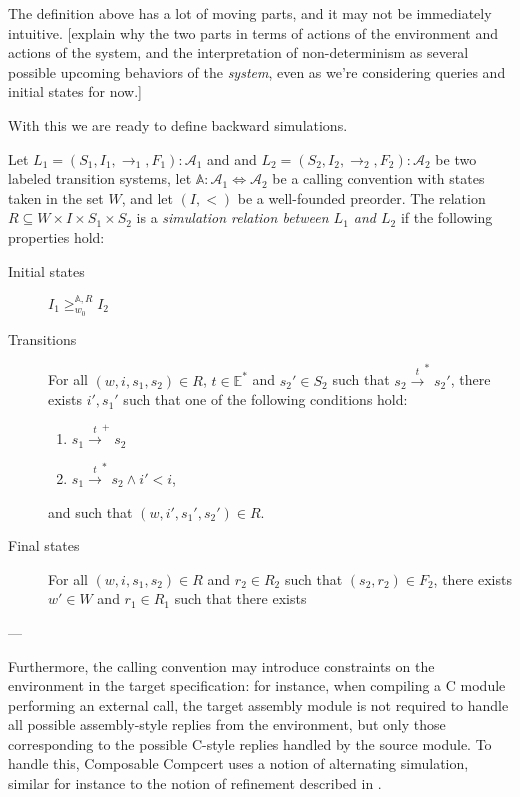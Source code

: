 The definition above has a lot of moving parts, and
it may not be immediately intuitive.
[explain why the two parts in terms of
actions of the environment and actions of the system,
and the interpretation of non-determinism as
several possible upcoming behaviors of the \emph{system},
even as we're considering queries and initial states for now.]

With this we are ready to define backward simulations.

\begin{definition}
Let $L_1 = (S_1, I_1, \rightarrow_1, F_1) : \mathcal{A}_1$ and
and $L_2 = (S_2, I_2, \rightarrow_2, F_2) : \mathcal{A}_2$
be two labeled transition systems,
let $\mathbb{A} : \mathcal{A}_1 \Leftrightarrow \mathcal{A}_2$
be a calling convention with states taken in the set $W$, and
let $(I, <)$ be a well-founded preorder.
The relation $R \subseteq W \times I \times S_1 \times S_2$
is a \emph{simulation relation between $L_1$ and $L_2$}
if the following properties hold:
\begin{description}
\item[Initial states]
  $I_1 \ge^{\mathbb{A},R}_{w_0} I_2$
\item[Transitions]
  For all $(w, i, s_1, s_2) \in R$, $t \in \mathbb{E}^*$ and $s_2' \in S_2$
  such that $s_2 \xrightarrow{t}^* s_2'$,
  there exists $i', s_1'$ such that one of the following conditions hold:
  \begin{enumerate}
    \item $s_1 \xrightarrow{t}^+ s_2$
    \item $s_1 \xrightarrow{t}^* s_2 \wedge i' < i$,
  \end{enumerate}
  and such that $(w, i', s_1', s_2') \in R$.
\item[Final states]
  For all $(w, i, s_1, s_2) \in R$ and $r_2 \in R_2$
  such that $(s_2, r_2) \in F_2$,
  there exists $w' \in W$ and $r_1 \in R_1$
  such that 
  there exists 

\end{description}
\end{definition}

---

Furthermore,
the calling convention may introduce
constraints on the environment in the target specification:
for instance,
when compiling a C module performing an external call,
the target assembly module is not required to handle
all possible assembly-style replies from the environment,
but only those corresponding to the possible C-style replies
handled by the source module.
To handle this,
Composable Compcert uses a notion of alternating simulation,
similar for instance to the notion of refinement
described in \cite{gmos}.

